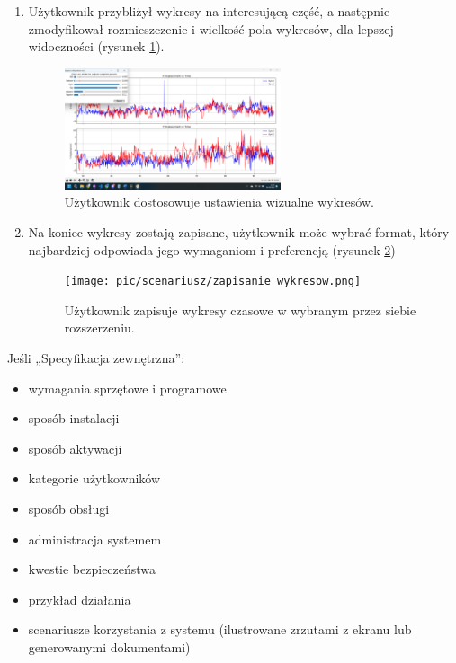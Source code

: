 \documentclass[a4paper,twoside,12pt]{book}
\begin{document}
\begin{enumerate}
	\item Użytkownik przybliżył wykresy na interesującą część, a następnie zmodyfikował rozmieszczenie i wielkość pola wykresów, dla lepszej widoczności (rysunek \ref{fig:scenariusz-ustawianie-wykresy}).
	
	\begin{figure}[H]
		\centering
		\includegraphics[width=0.6\textwidth]{pic/scenariusz/dostosowanie wykresów.png}
		\caption{Użytkownik dostosowuje ustawienia wizualne wykresów.}
		\label{fig:scenariusz-ustawianie-wykresy}
	\end{figure}

	\item Na koniec wykresy zostają zapisane, użytkownik może wybrać format, który najbardziej odpowiada jego wymaganiom i preferencją (rysunek \ref{fig:scenariusz-zapisywanie-wykresy})
	
	\begin{figure}[H]
		\centering
		\texttt{[image: pic/scenariusz/zapisanie wykresow.png]}
		\caption{Użytkownik zapisuje wykresy czasowe w wybranym przez siebie rozszerzeniu.}
		\label{fig:scenariusz-zapisywanie-wykresy}
	\end{figure}
\end{enumerate}

Jeśli „Specyfikacja zewnętrzna”:
\begin{itemize}
\item  wymagania sprzętowe i programowe
\item  sposób instalacji
\item  sposób aktywacji
\item  kategorie użytkowników
\item  sposób obsługi
\item  administracja systemem
\item  kwestie bezpieczeństwa
\item  przykład działania
\item  scenariusze korzystania z systemu (ilustrowane zrzutami z ekranu lub generowanymi dokumentami)
\end{itemize}
\end{document}
